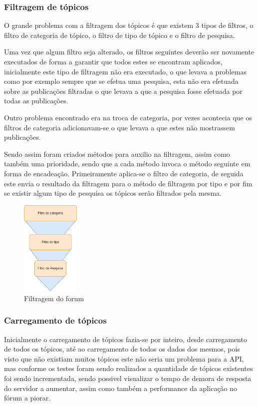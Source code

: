 \subsubsection{Filtragem de tópicos}
O grande problema com a filtragem dos tópicos é que existem 3 tipos de filtros, o filtro de categoria de tópico, o filtro de tipo de tópico e o filtro de pesquisa. 

Uma vez que algum filtro seja alterado, os filtros seguintes deverão ser novamente executados de forma a garantir que todos estes se encontram aplicados, inicialmente este tipo de filtragem não era executado, o que levava a problemas como por exemplo sempre que se efetua uma pesquisa, esta não era efetuada sobre as publicações filtradas o que levava a que a pesquisa fosse efetuada por todas as publicações.

Outro problema encontrado era na troca de categoria, por vezes acontecia que os filtros de categoria adicionavam-se o que levava a que estes não mostrassem publicações.

Sendo assim foram criados métodos para auxilio na filtragem, assim como também uma prioridade, sendo que a cada método invoca o método seguinte em forma de encadeação. Primeiramente aplica-se o filtro de categoria, de seguida este envia o resultado da filtragem para o método de filtragem por tipo e por fim se existir algum tipo de pesquisa os tópicos serão filtrados pela mesma.

\begin{figure}[htb]
  \centering
  \includegraphics[width=0.25\textwidth]{images/implementacao/frontend/forum/filtros/filtros.png}
  \caption{Filtragem do forum}
  \label{fig:73}
\end{figure}

\newpage

\subsubsection{Carregamento de tópicos}
Inicialmente o carregamento de tópicos fazia-se por inteiro, desde carregamento de todos os tópicos, até ao carregamento de todos os dados dos mesmos, pois visto que não existiam muitos tópicos este não seria um problema para a API, mas conforme os testes foram sendo realizados a quantidade de tópicos existentes foi sendo incrementada, sendo possivel visualizar o tempo de demora de resposta do servidor a aumentar, assim como também a performance da aplicação no fórum a piorar.

